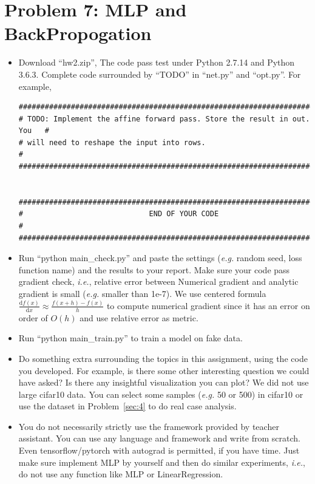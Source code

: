 \documentclass[12pt]{article}
\begin{document}
\section{Problem 7: MLP and BackPropogation} \label{sec:3}

\begin{itemize}
	
	\item Download ``hw2.zip'', The code pass test under Python 2.7.14 and Python 3.6.3. Complete code surrounded by ``TODO'' in ``net.py'' and ``opt.py''. For example,
	      \begin{verbatim}
###########################################################################
# TODO: Implement the affine forward pass. Store the result in out. You   #
# will need to reshape the input into rows.                               #
###########################################################################


###########################################################################
#                             END OF YOUR CODE                            #
###########################################################################
	\end{verbatim}
	\item Run ``python main\_check.py'' and paste the settings (\textit{e.g.} random seed, loss function name) and the results to  your report.  Make sure your code pass gradient check, \textit{i.e.}, relative error between Numerical gradient and analytic gradient is small (\textit{e.g.} smaller than 1e-7). We use centered formula $\displaystyle \frac{\mathrm{d}f(x)}{\mathrm{d}x} \approx \frac{f(x+h)-f(x)}{h}$ to compute numerical gradient since it has an error on order of $O(h)$ and use relative error as metric.
	\item Run ``python main\_train.py'' to train a model on fake data. 
	\item Do something extra surrounding the topics in this assignment,  using the code you developed. For example, is there some other interesting question we could have asked? Is there any insightful visualization you can plot? We did not use large cifar10 data. You can select some samples (\textit{e.g.} 50 or 500) in cifar10 or use the dataset in Problem~\ref{sec:4} to do real case analysis.
	\item You do not necessarily strictly use the framework provided by teacher assistant. You can use any language and framework and write from scratch.
	 Even tensorflow/pytorch with autograd is permitted, if you have time. 
	  Just make sure implement MLP by yourself and then do similar experiments, \textit{i.e.}, do not use any function like MLP or LinearRegression.  
\end{itemize}
\end{document}

